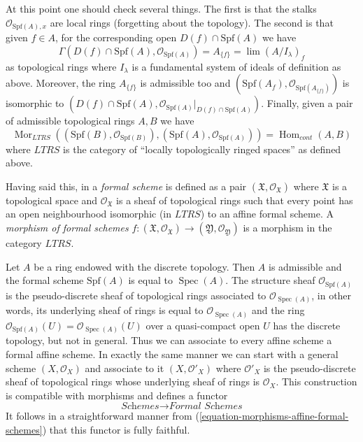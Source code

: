 \documentclass{stacks-project}
\theoremstyle{plain}
\theoremstyle{definition}
\theoremstyle{remark}
\numberwithin{equation}{subsection}
\def\lim{\mathop{\mathrm{lim}}\nolimits}
\def\Spec{\mathop{\mathrm{Spec}}}
\def\Hom{\mathop{\mathrm{Hom}}\nolimits}
\def\Mor{\mathop{\mathrm{Mor}}\nolimits}
\begin{document}
\medskip\noindent
At this point one should check several things. The first is that
the stalks $\mathcal{O}_{\text{Spf}(A), x}$ are local rings
(forgetting about the topology). The second is that given
$f \in A$, for the corresponding open $D(f) \cap \text{Spf}(A)$
we have
$$
\Gamma(D(f) \cap \text{Spf}(A), \mathcal{O}_{\text{Spf}(A)})
= A_{\{f\}} = \lim (A/I_\lambda)_f
$$
as topological rings where $I_\lambda$ is a fundamental system of ideals
of definition as above. Moreover, the ring $A_{\{f\}}$ is admissible too and
$(\text{Spf}(A_f), \mathcal{O}_{\text{Spf}(A_{\{f\}})})$
is isomorphic to
$(D(f) \cap \text{Spf}(A),
\mathcal{O}_{\text{Spf}(A)}|_{D(f) \cap \text{Spf}(A)})$.
Finally, given a pair of admissible topological rings $A, B$
we have
\begin{equation}
\label{equation-morphisms-affine-formal-schemes}
\Mor_{LTRS}((\text{Spf}(B), \mathcal{O}_{\text{Spf}(B)}),
(\text{Spf}(A), \mathcal{O}_{\text{Spf}(A)}))
= \Hom_{cont}(A, B)
\end{equation}
where $LTRS$ is the category of ``locally topologically ringed spaces''
as defined above.

\medskip\noindent
Having said this, in \cite{EGA} a {\it formal scheme} is defined as a pair
$(\mathfrak X, \mathcal{O}_\mathfrak X)$ where $\mathfrak X$
is a topological space and $\mathcal{O}_\mathfrak X$ is a sheaf
of topological rings such that every point has an open neighbourhood
isomorphic (in $LTRS$) to an affine formal scheme.
A {\it morphism of formal schemes}
$f : (\mathfrak X, \mathcal{O}_\mathfrak X) \to
(\mathfrak Y, \mathcal{O}_\mathfrak Y)$
is a morphism in the category $LTRS$.

\medskip\noindent
Let $A$ be a ring endowed with the discrete topology. Then $A$ is
admissible and the formal scheme $\text{Spf}(A)$ is equal to
$\Spec(A)$. The structure sheaf $\mathcal{O}_{\text{Spf}(A)}$
is the pseudo-discrete sheaf of topological rings associated
to $\mathcal{O}_{\Spec(A)}$, in other words, its underlying
sheaf of rings is equal to $\mathcal{O}_{\Spec(A)}$ and the
ring $\mathcal{O}_{\text{Spf}(A)}(U) = \mathcal{O}_{\Spec(A)}(U)$
over a quasi-compact open $U$ has the discrete topology,
but not in general. Thus we can associate to every affine scheme
a formal affine scheme. In exactly the same manner we can start
with a general scheme $(X, \mathcal{O}_X)$ and associate to
it $(X, \mathcal{O}'_X)$ where $\mathcal{O}'_X$ is the
pseudo-discrete sheaf of topological rings whose underlying
sheaf of rings is $\mathcal{O}_X$. This construction is
compatible with morphisms and defines a functor
\begin{equation}
\label{equation-compare-schemes-formal-schemes}
\textit{Schemes} \longrightarrow \textit{Formal Schemes}
\end{equation}
It follows in a straightforward manner from
(\ref{equation-morphisms-affine-formal-schemes})
that this functor is fully faithful.
\end{document}
